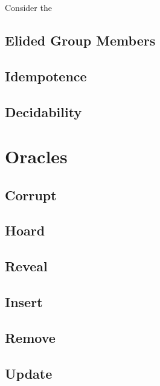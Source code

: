 Consider the 

\hypertarget{elided-group-members}{%
\subsection{Elided Group Members}\label{elided-group-members}}

\hypertarget{idempotence}{%
\subsection{Idempotence}\label{idempotence}}

\hypertarget{decidability}{%
\subsection{Decidability}\label{decidability}}

\hypertarget{sec:game-oracles}{%
\section{Oracles}\label{sec:game-oracles}}

\hypertarget{corrupt}{%
\subsection{Corrupt}\label{corrupt}}

\hypertarget{hoard}{%
\subsection{Hoard}\label{hoard}}

\hypertarget{reveal}{%
\subsection{Reveal}\label{reveal}}

\hypertarget{insert}{%
\subsection{Insert}\label{insert}}

\hypertarget{remove}{%
\subsection{Remove}\label{remove}}

\hypertarget{update}{%
\subsection{Update}\label{update}}

